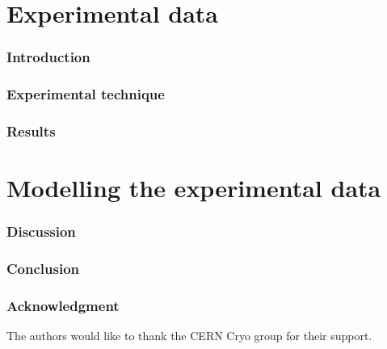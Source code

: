 \documentclass[a4paper,10pt]{scrartcl}
\newcommand*{\notFORPAPER}{}%
\begin{document}


\part{Experimental data}

\section{Introduction}
\label{sec:intro}
\ifdefined\notFORPAPER

\else

\fi 

\section{Experimental technique}
\label{sec:ET}
\ifdefined\notFORPAPER

\else

\fi



\section{Results}
\label{sec:InducedPulses}
\ifdefined\notFORPAPER

\else

\fi

\part{Modelling the experimental data}

\section{Discussion}
\label{sec:discussion}
\ifdefined\notFORPAPER

\else

\fi

\section{Conclusion}
\label{sec:conclusion}
\ifdefined\notFORPAPER

\else

\fi

\section*{Acknowledgment}
The authors would like to thank the CERN Cryo group for their support. 


\small


\end{document}
